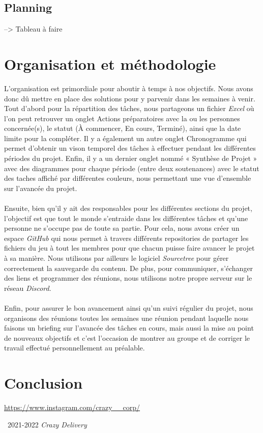 \documentclass[11pt,a4paper]{article}
\newcommand{\cd}{\textit{Crazy Delivery}}
\begin{document}
  \subsection{Planning}
    --> Tableau à faire

\section{Organisation et méthodologie}
L'organisation est primordiale pour aboutir à temps à nos objectifs. Nous avons donc dû mettre en place des solutions pour y parvenir dans les semaines à venir. \\
Tout d'abord pour la répartition des tâches, nous partageons un fichier \textit{Excel} où l'on peut retrouver un onglet Actions préparatoires avec la ou les personnes concernée(s), le statut (À commencer, En cours, Terminé), ainsi que la date limite pour la compléter. Il y a également un autre onglet Chronogramme qui permet d’obtenir un vison temporel des tâches à effectuer pendant les différentes périodes du projet.  Enfin, il y a un dernier onglet nommé « Synthèse de Projet » avec des diagrammes pour chaque période (entre deux soutenances) avec le statut des taches affiché par différentes couleurs, nous permettant une vue d’ensemble sur l’avancée du projet. \\ \\
Ensuite, bien qu’il y ait des responsables pour les différentes sections du projet, l’objectif est que tout le monde s’entraide dans les différentes tâches et qu’une personne ne s’occupe pas de toute sa partie. Pour cela, nous avons créer un espace \textit{GitHub} qui nous permet à travers différents repositories de partager les fichiers du jeu à tout les membres pour que chacun puisse faire avancer le projet à sa manière. Nous utilisons par ailleurs le logiciel \textit{Sourcetree} pour gérer correctement la sauvegarde du contenu. De plus, pour communiquer, s’échanger des liens et programmer des réunions, nous utilisons notre propre serveur sur le réseau \textit{Discord}.\\ \\
Enfin, pour assurer le bon avancement ainsi qu’un suivi régulier du projet, nous organisons des réunions toutes les semaines une réunion pendant laquelle nous faisons un briefing sur l’avancée des tâches en cours, mais aussi la mise au point de nouveaux objectifs et c’est l’occasion de montrer au groupe et de corriger le travail effectué personnellement au préalable.\\

\clearpage
\section{Conclusion}

\begin{bibliography}{9}
    \url{https://www.instagram.com/crazy__corp/}

\end{bibliography}

\textcopyright\, 2021-2022 \cd
\end{document}
